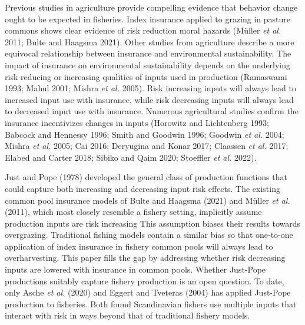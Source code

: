 \documentclass[
  letterpaper,
  DIV=11,
  numbers=noendperiod]{scrartcl}
\theoremstyle{plain}
\theoremstyle{plain}
\theoremstyle{remark}
\begin{document}
Previous studies in agriculture provide compelling evidence that
behavior change ought to be expected in fisheries. Index insurance
applied to grazing in pasture commons shows clear evidence of risk
reduction moral hazards (Müller \emph{et al.} 2011; Bulte and Haagsma
2021). Other studies from agriculture describe a more equivocal
relationship between insurance and environmental sustainability. The
impact of insurance on environmental sustainability depends on the
underlying risk reducing or increasing qualities of inputs used in
production (Ramaswami 1993; Mahul 2001; Mishra \emph{et al.} 2005). Risk
increasing inputs will always lead to increased input use with
insurance, while risk decreasing inputs will always lead to decreased
input use with insurance. Numerous agricultural studies confirm the
insurance incentivizes changes in inputs (Horowitz and Lichtenberg 1993;
Babcock and Hennessy 1996; Smith and Goodwin 1996; Goodwin \emph{et al.}
2004; Mishra \emph{et al.} 2005; Cai 2016; Deryugina and Konar 2017;
Claassen \emph{et al.} 2017; Elabed and Carter 2018; Sibiko and Qaim
2020; Stoeffler \emph{et al.} 2022).

Just and Pope (1978) developed the general class of production functions
that could capture both increasing and decreasing input risk effects.
The existing common pool insurance models of Bulte and Haagsma (2021)
and Müller \emph{et al.} (2011), which most closely resemble a fishery
setting, implicitly assume production inputs are risk increasing This
assumption biases their results towards overgrazing. Traditional fishing
models contain a similar bias so that one-to-one application of index
insurance in fishery common pools will always lead to overharvesting.
This paper fills the gap by addressing whether risk decreasing inputs
are lowered with insurance in common pools. Whether Just-Pope
productions suitably capture fishery production is an open question. To
date, only Asche \emph{et al.} (2020) and Eggert and Tveteras (2004) has
applied Just-Pope production to fisheries. Both found Scandinavian
fishers use multiple inputs that interact with risk in ways beyond that
of traditional fishery models.
\end{document}
